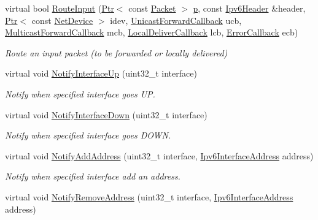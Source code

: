 \begin{DoxyCompactItemize}
virtual bool \hyperlink{classns3_1_1Ipv6StaticRouting_a33810db6250f018b4587dc34a43a80cb}{Route\+Input} (\hyperlink{classns3_1_1Ptr}{Ptr}$<$ const \hyperlink{classns3_1_1Packet}{Packet} $>$ \hyperlink{lte__link__budget__x2__handover__measures_8m_ac9de518908a968428863f829398a4e62}{p}, const \hyperlink{classns3_1_1Ipv6Header}{Ipv6\+Header} \&header, \hyperlink{classns3_1_1Ptr}{Ptr}$<$ const \hyperlink{classns3_1_1NetDevice}{Net\+Device} $>$ idev, \hyperlink{classns3_1_1Ipv6RoutingProtocol_a579fd6755ee873009819f7117371fea7}{Unicast\+Forward\+Callback} ucb, \hyperlink{classns3_1_1Ipv6RoutingProtocol_a5f12e04512ce8e5808c3cceff6b8918f}{Multicast\+Forward\+Callback} mcb, \hyperlink{classns3_1_1Ipv6RoutingProtocol_a93f6c06be1e024747e95f4299eba74a6}{Local\+Deliver\+Callback} lcb, \hyperlink{classns3_1_1Ipv6RoutingProtocol_abfdf43594e2ae97e1a4dc340e3a086a5}{Error\+Callback} ecb)
\begin{DoxyCompactList}\small\item\em Route an input packet (to be forwarded or locally delivered) \end{DoxyCompactList}\item 
virtual void \hyperlink{classns3_1_1Ipv6StaticRouting_a9750930029ffe2eaafda77ba77918472}{Notify\+Interface\+Up} (uint32\+\_\+t interface)
\begin{DoxyCompactList}\small\item\em Notify when specified interface goes UP. \end{DoxyCompactList}\item 
virtual void \hyperlink{classns3_1_1Ipv6StaticRouting_a1e917452e99ee697b9ffd5acebfc0a02}{Notify\+Interface\+Down} (uint32\+\_\+t interface)
\begin{DoxyCompactList}\small\item\em Notify when specified interface goes D\+O\+WN. \end{DoxyCompactList}\item 
virtual void \hyperlink{classns3_1_1Ipv6StaticRouting_ab4f7777b5228f498fa3493c753d50b8f}{Notify\+Add\+Address} (uint32\+\_\+t interface, \hyperlink{classns3_1_1Ipv6InterfaceAddress}{Ipv6\+Interface\+Address} address)
\begin{DoxyCompactList}\small\item\em Notify when specified interface add an address. \end{DoxyCompactList}\item 
virtual void \hyperlink{classns3_1_1Ipv6StaticRouting_ab100c4857d93e5f0cc980e8024838e68}{Notify\+Remove\+Address} (uint32\+\_\+t interface, \hyperlink{classns3_1_1Ipv6InterfaceAddress}{Ipv6\+Interface\+Address} address)

\end{DoxyCompactItemize}
